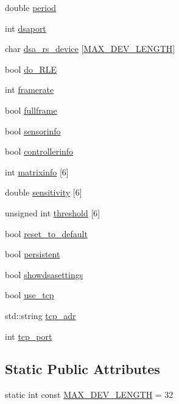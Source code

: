 \begin{DoxyCompactItemize}
\item 
double \hyperlink{classcSDHOptions_a62f70e83e50968e9cdee7b55cff12806}{period}
\item 
int \hyperlink{classcSDHOptions_a0de19c3e4d29f927c9bd8a4071a8e13d}{dsaport}
\item 
char \hyperlink{classcSDHOptions_a8d9d3490f0a39e8982cf9ae4c77f2147}{dsa\-\_\-rs\-\_\-device} \mbox{[}\hyperlink{classcSDHOptions_a9caeb9858b718ed48145a833be2c9178}{\-M\-A\-X\-\_\-\-D\-E\-V\-\_\-\-L\-E\-N\-G\-T\-H}\mbox{]}
\item 
bool \hyperlink{classcSDHOptions_ab285c659c8f86f4dd2c1582f9a5e3608}{do\-\_\-\-R\-L\-E}
\item 
int \hyperlink{classcSDHOptions_a7bdd78ad26a17faeceec15e2431a1c3e}{framerate}
\item 
bool \hyperlink{classcSDHOptions_a9c8cd3c89d1175f2a75afbbb119a7f9b}{fullframe}
\item 
bool \hyperlink{classcSDHOptions_a9ea9c47ffd54eb7a557e672cc76b23d3}{sensorinfo}
\item 
bool \hyperlink{classcSDHOptions_a3e1089848fb7702f5e94dd673601f463}{controllerinfo}
\item 
int \hyperlink{classcSDHOptions_a3dcaa4689b89c3f480cad4744a72c0f8}{matrixinfo} \mbox{[}6\mbox{]}
\item 
double \hyperlink{classcSDHOptions_addfa8552244a84c62fe26ef5c261a19d}{sensitivity} \mbox{[}6\mbox{]}
\item 
unsigned int \hyperlink{classcSDHOptions_abbd91d2dce6cda8d2e4d5103ce44c3c0}{threshold} \mbox{[}6\mbox{]}
\item 
bool \hyperlink{classcSDHOptions_afedb88e59b2ecf58b80c7b0b861ee189}{reset\-\_\-to\-\_\-default}
\item 
bool \hyperlink{classcSDHOptions_aca724e741552d1a6c415abf6a0bf2ecf}{persistent}
\item 
bool \hyperlink{classcSDHOptions_a73021f34d61c57f5991490b8dda9b557}{showdsasettings}
\item 
bool \hyperlink{classcSDHOptions_a57533df7afeb116231686a59bc86a5cd}{use\-\_\-tcp}
\item 
std\-::string \hyperlink{classcSDHOptions_a247c378f5874482d97343fc6c0e577be}{tcp\-\_\-adr}
\item 
int \hyperlink{classcSDHOptions_a8c7190b3d89ec6ff659d171e59fe5f45}{tcp\-\_\-port}
\end{DoxyCompactItemize}
\subsection*{\-Static \-Public \-Attributes}
\begin{DoxyCompactItemize}
\item 
static int const \hyperlink{classcSDHOptions_a9caeb9858b718ed48145a833be2c9178}{\-M\-A\-X\-\_\-\-D\-E\-V\-\_\-\-L\-E\-N\-G\-T\-H} = 32
\end{DoxyCompactItemize}


